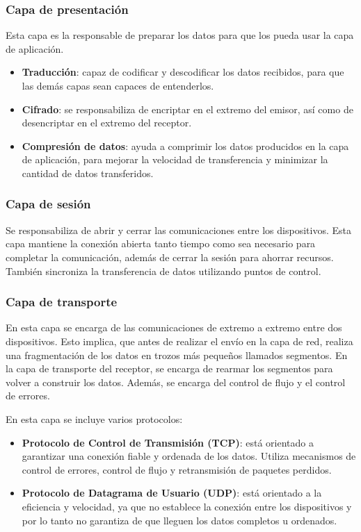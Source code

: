 \subsubsection{Capa de presentación}
\label{subsubsec:CapaPresentacion}
Esta capa es la responsable de preparar los datos para que los pueda usar la capa de aplicación.
\begin{itemize}
    \item \textbf{Traducción}: capaz de codificar y descodificar los datos recibidos, para que las demás capas sean capaces de entenderlos.
    \item \textbf{Cifrado}: se responsabiliza de encriptar en el extremo del emisor, así como de desencriptar en el extremo del receptor.
    \item \textbf{Compresión de datos}: ayuda a comprimir los datos producidos en la capa de aplicación, para mejorar la velocidad de transferencia y minimizar la cantidad de datos transferidos.
\end{itemize}

\subsubsection{Capa de sesión}
\label{subsubsec:CapaSesion}
Se responsabiliza de abrir y cerrar las comunicaciones entre los dispositivos. Esta capa mantiene la conexión abierta tanto tiempo como sea necesario para completar la comunicación, además de cerrar la sesión para ahorrar recursos. También sincroniza la transferencia de datos utilizando puntos de control.

\subsubsection{Capa de transporte}
\label{subsubsec:CapaTransporte}
En esta capa se encarga de las comunicaciones de extremo a extremo entre dos dispositivos. Esto implica, que antes de realizar el envío en la capa de red, realiza una fragmentación de los datos en trozos más pequeños llamados segmentos. En la capa de transporte del receptor, se encarga de rearmar los segmentos para volver a construir los datos. Además, se encarga del control de flujo y el control de errores.

En esta capa se incluye varios protocolos:
\begin{itemize}
    \item \textbf{Protocolo de Control de Transmisión (TCP)}: está orientado a garantizar una conexión fiable y ordenada de los datos. Utiliza mecanismos de control de errores, control de flujo y retransmisión de paquetes perdidos.
    \item \textbf{Protocolo de Datagrama de Usuario (UDP)}: está orientado a la eficiencia y velocidad, ya que no establece la conexión entre los dispositivos y por lo tanto no garantiza de que lleguen los datos completos u ordenados.
\end{itemize}

